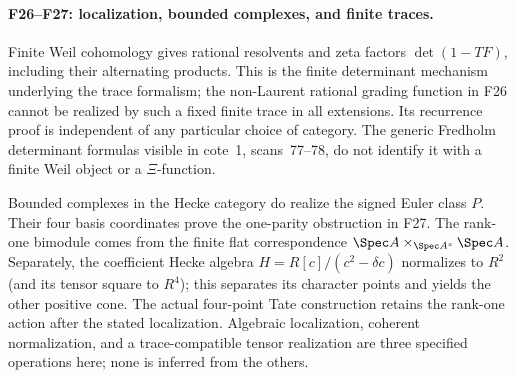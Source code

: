 \documentclass[11pt,a4paper]{article}
\newcommand{\fid}[1]{\textsf{#1}}\newcommand{\gate}[1]{\textsf{#1}}
\theoremstyle{named}\newtheorem{finding}{Finding}[section]
\theoremstyle{definition}\newtheorem{definition}[finding]{Definition}
\theoremstyle{remark}\newtheorem{remark}[finding]{Remark}
\begin{document}
\paragraph{\fid{F26}--\fid{F27}: localization, bounded complexes, and finite traces.}
Finite Weil cohomology gives rational resolvents and zeta factors
$\det(1-TF)$, including their alternating products. This is the
finite determinant mechanism underlying the trace formalism; the
non-Laurent rational grading function in \fid{F26} cannot be realized
by such a fixed finite trace in all extensions. Its recurrence proof
is independent of any particular choice of category. The generic
Fredholm determinant formulas visible in cote~1, scans~77--78,
do not identify it with a finite Weil object or a $\Xi$-function.

Bounded complexes in the Hecke category do realize the signed Euler
class $P$. Their four basis coordinates prove the one-parity
obstruction in \fid{F27}. The rank-one bimodule comes from the
finite flat correspondence
$\Spec A\times_{\Spec A^s}\Spec A$. Separately, the coefficient
Hecke algebra $H=R[c]/(c^2-\delta c)$ normalizes to $R^2$
(and its tensor square to $R^4$); this separates its character
points and yields the other positive cone.
The actual four-point Tate construction retains the rank-one action
after the stated localization. Algebraic localization, coherent
normalization, and a trace-compatible tensor realization are three
specified operations here; none is inferred from the others.
\end{document}
